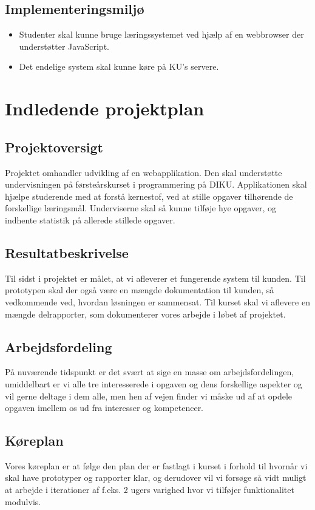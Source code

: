 \documentclass[12pt]{article}
\begin{document}
\subsection{Implementeringsmiljø}
\begin{itemize}
\item Studenter skal kunne bruge læringssystemet ved hjælp af en webbrowser der understøtter JavaScript.
\item Det endelige system skal kunne køre på KU's servere.
\end{itemize}

\section{Indledende projektplan}

\subsection{Projektoversigt}
Projektet omhandler udvikling af en webapplikation. Den skal understøtte undervisningen på førsteårskurset i programmering på DIKU. Applikationen skal hjælpe studerende med at forstå kernestof, ved at stille opgaver tilhørende de forskellige læringsmål. Underviserne skal så kunne tilføje hye opgaver, og indhente statistik på allerede stillede opgaver.
\subsection{Resultatbeskrivelse}
Til sidst i projektet er målet, at vi afleverer et fungerende system til kunden. Til prototypen skal der også være en mængde dokumentation til kunden, så vedkommende ved, hvordan løsningen er sammensat.
Til kurset skal vi aflevere en mængde delrapporter, som dokumenterer vores arbejde i løbet af projektet.
\subsection{Arbejdsfordeling}
På nuværende tidspunkt er det svært at sige en masse om arbejdsfordelingen, umiddelbart er vi alle tre interesserede i opgaven og dens forskellige aspekter og vil gerne deltage i dem alle, men hen af vejen finder vi måske ud af at opdele opgaven imellem os ud fra interesser og kompetencer.
\subsection{Køreplan}
Vores køreplan er at følge den plan der er fastlagt i kurset i forhold til hvornår vi skal have prototyper og rapporter klar, og derudover vil vi forsøge så vidt muligt at arbejde i iterationer af f.eks. 2 ugers varighed hvor vi tilføjer funktionalitet modulvis.
\end{document}
